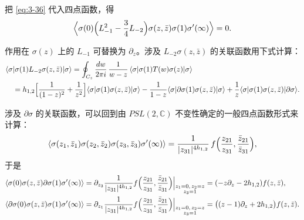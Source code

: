 
把 \eqref{eq:3-36} 代入四点函数，得
\begin{equation}\label{eq:3-37}
  \Bigl\langle\sigma(0)\Bigl(L_{-1}^2-\frac34L_{-2}\Bigr)\sigma(z,\bar z)\sigma(1)\sigma'(\infty)\Bigr\rangle=0 .
\end{equation}

作用在 $\sigma(z)$ 上的 $L_{-1}$ 可替换为 $\partial_z$。涉及 $L_{-2}\sigma(z,\bar z)$ 的关联函数用下式计算：
\begin{equation}\label{eq:3-38}
  \begin{aligned}
  &\langle\sigma|\sigma(1)L_{-2}\sigma(z,\bar z)|\sigma\rangle
  =\oint_{C_z}\frac{dw}{2\pi i}\,\frac{1}{w-z}\,
  \langle\sigma|\sigma(1)T(w)\sigma(z)|\sigma\rangle\\
  &\quad=h_{1,2}\Bigl[\frac{1}{(1-z)^2}+\frac{1}{z^2}\Bigr]
  \langle\sigma|\sigma(1)\sigma(z,\bar z)|\sigma\rangle
  -\frac{1}{1-z}\langle\sigma|\partial\sigma(1)\sigma(z,\bar z)|\sigma\rangle
  +\frac1z\langle\sigma|\sigma(1)\sigma(z,\bar z)|\partial\sigma\rangle .
  \end{aligned}
\end{equation}


涉及 $\partial\sigma$ 的关联函数，可以回到由 $PSL(2,\mathbb{C})$ 不变性确定的一般四点函数形式来计算：
\begin{equation}\label{eq:3-39}
  \langle\sigma(z_1,\bar z_1)\sigma(z_2,\bar z_2)\sigma(z_3,\bar z_3)\sigma'(\infty)\rangle
  =\frac{1}{|z_{31}|^{4h_{1,2}}}\,
  f\Bigl(\frac{z_{21}}{z_{31}},\frac{\bar z_{21}}{\bar z_{31}}\Bigr),
\end{equation}
于是
\begin{equation}\label{eq:3-40}
  \begin{aligned}
  \langle\sigma(0)\sigma(z,\bar z)\partial\sigma(1)\sigma'(\infty)\rangle
  &=\partial_{z_3}\frac{1}{|z_{31}|^{4h_{1,2}}}
  f\Bigl(\frac{z_{21}}{z_{31}},\frac{\bar z_{21}}{\bar z_{31}}\Bigr)
  \Big|_{\substack{z_1=0,\,z_2=z\\ z_3=1}}
  =(-z\partial_z-2h_{1,2})f(z,\bar z),\\
  \langle\partial\sigma(0)\sigma(z,\bar z)\sigma(1)\sigma'(\infty)\rangle
  &=\partial_{z_1}\frac{1}{|z_{31}|^{4h_{1,2}}}
  f\Bigl(\frac{z_{21}}{z_{31}},\frac{\bar z_{21}}{\bar z_{31}}\Bigr)
  \Big|_{\substack{z_1=0,\,z_2=z\\ z_3=1}}
  =\bigl((z-1)\partial_z+2h_{1,2}\bigr)f(z,\bar z).
  \end{aligned}
\end{equation}


